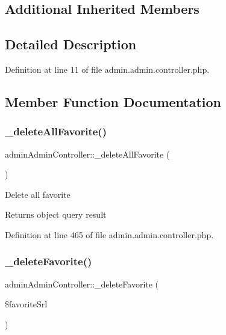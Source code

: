 \subsection*{Additional Inherited Members}


\subsection{Detailed Description}


Definition at line 11 of file admin.\+admin.\+controller.\+php.



\subsection{Member Function Documentation}
\hypertarget{classadminAdminController_af03754d231177ae0326f0cc262dd6dd7}{}\label{classadminAdminController_af03754d231177ae0326f0cc262dd6dd7} 
\subsubsection{\texorpdfstring{\+\_\+delete\+All\+Favorite()}{\_deleteAllFavorite()}}
{\footnotesize\ttfamily admin\+Admin\+Controller\+::\+\_\+delete\+All\+Favorite (\begin{DoxyParamCaption}{ }\end{DoxyParamCaption})}

Delete all favorite \begin{DoxyReturn}{Returns}
object query result 
\end{DoxyReturn}


Definition at line 465 of file admin.\+admin.\+controller.\+php.

\hypertarget{classadminAdminController_aeaf185ff2307ca6fcccaf1589b25bc6f}{}\label{classadminAdminController_aeaf185ff2307ca6fcccaf1589b25bc6f} 
\subsubsection{\texorpdfstring{\+\_\+delete\+Favorite()}{\_deleteFavorite()}}
{\footnotesize\ttfamily admin\+Admin\+Controller\+::\+\_\+delete\+Favorite (\begin{DoxyParamCaption}\item[{}]{\$favorite\+Srl }\end{DoxyParamCaption})}

